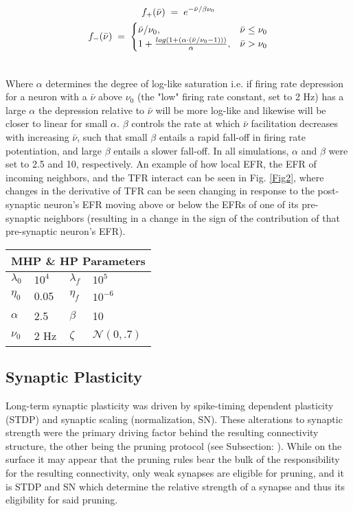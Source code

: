 \documentclass[10pt,letterpaper]{article}
\begin{document}
\begin{gather} 
	 f_+(\bar{\nu}) \;=\; e^{-\bar{\nu}/\beta \nu_0} \\
	 f_-(\bar{\nu}) \;=\;
	 \begin{cases}
	 \bar{\nu}/\nu_0, &  \bar{\nu} \leq \nu_0 \\
	1 + \frac{log\left(1 + \left(\alpha \cdot (\bar{\nu}/\nu_0 -   1)\right)\right)}{\alpha}, & \bar{\nu}> \nu_0 
	 \end{cases}\\ \notag
\end{gather}
		
Where $\alpha$ determines the degree of log-like saturation i.e. if firing rate depression for a neuron with a $\bar{\nu}$ above $\nu_0$ (the "low" firing rate constant, set to 2 Hz) has a large $\alpha$ the depression relative to $\bar{\nu}$ will be more log-like and likewise will be closer to linear for small $\alpha$. $\beta$ controls the rate at which $\bar{\nu}$ facilitation decreases with increasing $\bar{\nu}$, such that small $\beta$ entails a rapid fall-off in firing rate potentiation, and large $\beta$ entails a slower fall-off. In all simulations, $\alpha$ and $\beta$ were set to 2.5 and 10, respectively. An example of how local EFR, the EFR of incoming neighbors, and the TFR interact can be seen in Fig. \ref{Fig2}, where changes in the derivative of TFR can be seen changing in response to the post-synaptic neuron's EFR moving above or below the EFRs of one of its pre-synaptic neighbors (resulting in a change in the sign of the contribution of that pre-synaptic neuron's EFR).
	\newline \newline
\begin{tabular}{ l l l l }
	\multicolumn{4}{l}{\textbf{MHP \& HP Parameters}}  \\ \hline
	$\lambda_0$ & $10^4$ & $\lambda_f$ & $10^{5}$ \\
	$\eta_0$ & 0.05 & $\eta_f$ & $10^{-6}$ \\
	$\alpha$ & 2.5&  $\beta$ & 10 \\
	$\nu_0$ & 2 Hz & $\zeta$ & $\mathcal{N}(0, .7)$ \\
\end{tabular}
	
\subsection*{Synaptic Plasticity}
	
Long-term synaptic plasticity was driven by spike-timing dependent plasticity (STDP) and synaptic scaling (normalization, SN). These alterations to synaptic strength were the primary driving factor behind the resulting connectivity structure, the other being the pruning protocol (see Subsection:  ). While on the surface it may appear that the pruning rules bear the bulk of the responsibility for the resulting connectivity, only weak synapses are eligible for pruning, and it is STDP and SN which determine the relative strength of a synapse and thus its eligibility for said pruning. 
	
\end{document}
